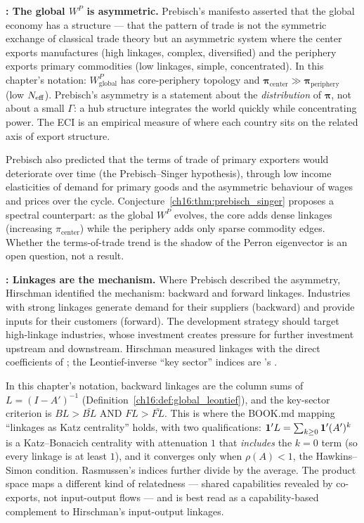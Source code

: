 \documentclass[../structural_economics_book.tex]{subfiles}
\begin{document}
\textbf{\citet{prebisch1949desarrollo}: The global $W^P$ is asymmetric.} Prebisch's manifesto asserted that the global economy has a structure --- that the pattern of trade is not the symmetric exchange of classical trade theory but an asymmetric system where the center exports manufactures (high linkages, complex, diversified) and the periphery exports primary commodities (low linkages, simple, concentrated). In this chapter's notation: $W^P_{\text{global}}$ has core-periphery topology and $\boldsymbol{\pi}_{\text{center}} \gg \boldsymbol{\pi}_{\text{periphery}}$ (low $N_{\text{eff}}$). Prebisch's asymmetry is a statement about the \emph{distribution} of $\boldsymbol{\pi}$, not about a small $\Gamma$: a hub structure integrates the world quickly while concentrating power. The ECI is an empirical measure of where each country sits on the related axis of export structure.

Prebisch also predicted that the terms of trade of primary exporters would deteriorate over time (the Prebisch--Singer hypothesis), through low income elasticities of demand for primary goods and the asymmetric behaviour of wages and prices over the cycle. Conjecture~\ref{ch16:thm:prebisch_singer} proposes a spectral counterpart: as the global $W^P$ evolves, the core adds dense linkages (increasing $\pi_{\text{center}}$) while the periphery adds only sparse commodity edges. Whether the terms-of-trade trend is the shadow of the Perron eigenvector is an open question, not a result.

\textbf{\citet{hirschman1958strategy}: Linkages are the mechanism.} Where Prebisch described the asymmetry, Hirschman identified the mechanism: backward and forward linkages. Industries with strong linkages generate demand for their suppliers (backward) and provide inputs for their customers (forward). The development strategy should target high-linkage industries, whose investment creates pressure for further investment upstream and downstream. Hirschman measured linkages with the direct coefficients of \citet{chenery1958international}; the Leontief-inverse ``key sector'' indices are \citeauthor{rasmussen1956studies}'s \citeyearpar{rasmussen1956studies}.

In this chapter's notation, backward linkages are the column sums of $L = (I - A')^{-1}$ (Definition~\ref{ch16:def:global_leontief}), and the key-sector criterion is $BL > \bar{BL}$ AND $FL > \bar{FL}$. This is where the BOOK.md mapping ``linkages as Katz centrality'' holds, with two qualifications: $\mathbf{1}'L = \sum_{k \geq 0}\mathbf{1}'(A')^k$ is a Katz--Bonacich centrality with attenuation $1$ that \emph{includes} the $k = 0$ term (so every linkage is at least $1$), and it converges only when $\rho(A) < 1$, the Hawkins--Simon condition. Rasmussen's indices further divide by the average. The product space \citep{hidalgo2007product} maps a different kind of relatedness --- shared capabilities revealed by co-exports, not input-output flows --- and is best read as a capability-based complement to Hirschman's input-output linkages.
\end{document}
